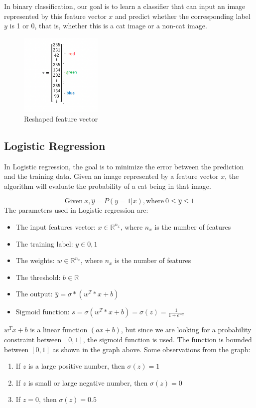 \documentclass[letterpaper,12pt,notitlepage,twoside]{report}
\begin{document}
\begin{example}
     In binary classification, our goal is to learn a classifier that can input an image represented by this feature vector $x$ and predict whether the corresponding label $y$ is 1 or 0, that is, whether this is a cat image or a non-cat image. 
\end{example}

\begin{figure}[h]
	\centering
	\includegraphics[width=0.35\textwidth]{Images/Reshaped feature vector.png}
	\caption{Reshaped feature vector}
	\label{fig:6}
\end{figure}
\FloatBarrier

\subsection*{Logistic Regression}
In Logistic regression, the goal is to minimize the error between the prediction and the training data. Given an image represented by a feature vector $x$, the algorithm will evaluate the probability of a cat being in that image.

\begin{equation}
\text{Given}~ x , \hat{y} = P(y=1|x), \text{where}~0 \leq \hat{y} \leq 1
\end{equation}
The parameters used in Logistic regression are:
\begin{itemize}[nosep]
\item The input features vector: $x \in \mathbb{R}^{n_x}$, where $n_x$ is the number of features
\item The training label: $y \in 0,1$
\item The weights: $w \in \mathbb{R}^{n_x}$, where $n_x$ is the number of features
\item The threshold: $b \in \mathbb{R}$
\item The output: $\hat{y} = \sigma*(w^T*x+b)$
\item Sigmoid function: $s = \sigma(w^T*x+b) = \sigma(z)= \frac{1}{1+e^{-z}}$
\end{itemize}
$w^Tx+b$ is a linear function $(ax+b)$, but since we are looking for a probability constraint between $[0,1]$, the sigmoid function is used. The function is bounded between $[0,1]$ as shown in the graph above.
Some observations from the graph:
\begin{enumerate}[nosep]
\item If $z$ is a large positive number, then $\sigma(z) = 1$
\item If $z$ is small or large negative number, then $\sigma(z) = 0$
\item If $z=0$, then $\sigma(z) = 0.5$
\end{enumerate}
\end{document}
